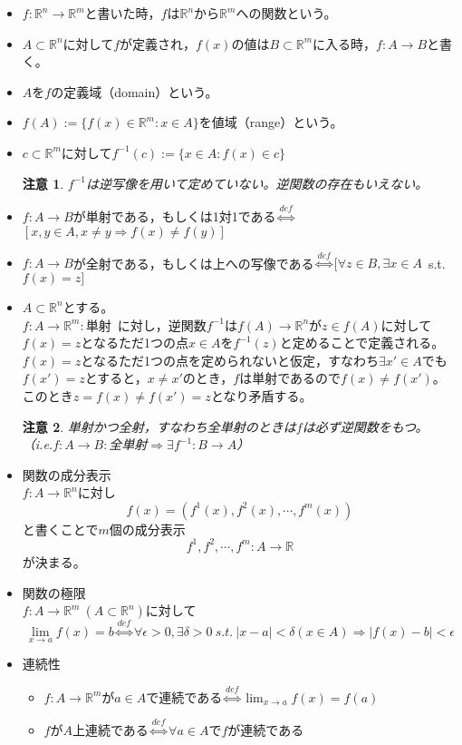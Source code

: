 \documentclass[dvipdfmx,a4j,10pt]{jsarticle}
\theoremstyle{mystyle1}
\theoremstyle{mystyle2}
\newtheorem{note}{注意}
\begin{document}
\begin{itemize}
    \item $f:\mathbb{R}^n\to\mathbb{R}^m$と書いた時，$f$は$\mathbb{R}^n$から$\mathbb{R}^m$への関数という。
    \item $A\subset\mathbb{R}^n$に対して$f$が定義され，$f(x)$の値は$B\subset\mathbb{R}^m$に入る時，$f:A\to B$と書く。
    \item $A$を$f$の定義域（domain）という。
    \item $f(A):=\{f(x)\in\mathbb{R}^m:x\in A\}$を値域（range）という。
    \item $c\subset\mathbb{R}^m$に対して$f^{-1}(c):=\{x\in A:f(x)\in c\}$
    \begin{note}
        $f^{-1}$は逆写像を用いて定めていない。逆関数の存在もいえない。
    \end{note}
    \item $f:A\to B$が単射である，もしくは1対1である$\overset{def}{\Leftrightarrow}$$[x,y\in A,x\neq y \Rightarrow f(x)\neq f(y)]$
    \item $f:A\to B$が全射である，もしくは上への写像である$\overset{def}{\Leftrightarrow}$$[\forall z\in B,\exists x\in A$\ s.t.\ $f(x)=z]$
    \item $A\subset\mathbb{R}^n$とする。\\
    $f:A\to\mathbb{R}^m:$単射\ に対し，逆関数$f^{-1}$は$f(A)\to\mathbb{R}^n$が$z\in f(A)$に対して$f(x)=z$となるただ1つの点$x\in A$を$f^{-1}(z)$と定めることで定義される。\\
    $f(x)=z$となるただ1つの点を定められないと仮定，すなわち$\exists x'\in A$でも$f(x')=z$とすると，$x\neq x'$のとき，$f$は単射であるので$f(x)\neq f(x')$。このとき$z=f(x)\neq f(x')=z$となり矛盾する。
    \begin{note}
        単射かつ全射，すなわち全単射のときは$f$は必ず逆関数をもつ。\\（i.e.$f:A\to B:$全単射$\Rightarrow$$\exists f^{-1}:B\to A$）
    \end{note}
    \item 関数の成分表示\\
    $f:A\to\mathbb{R}^n$に対し
    \[
    f(x)=(f^1(x),f^2(x),\cdots,f^m(x))
    \]
    と書くことで$m$個の成分表示
    \[
    f^1,f^2,\cdots,f^m:A\to\mathbb{R}
    \]
    が決まる。
    \item 関数の極限\\
    $f:A\to\mathbb{R}^m\ (A\subset\mathbb{R}^n)$に対して
    \[
    \lim_{x\to a}f(x)=b \overset{def}{\Leftrightarrow} \forall\epsilon>0,\exists\delta>0\ s.t.\ |x-a|<\delta(x\in A)\Rightarrow|f(x)-b|<\epsilon
    \]
    \item 連続性
    \begin{itemize}
        \item $f:A\to\mathbb{R}^m$が$a\in A$で連続である$\overset{def}{\Leftrightarrow}$$\displaystyle\lim_{x\to a}f(x)=f(a)$
        \item $f$が$A$上連続である$\overset{def}{\Leftrightarrow}$$\forall a\in A$で$f$が連続である
    \end{itemize}
\end{itemize}
\end{document}
